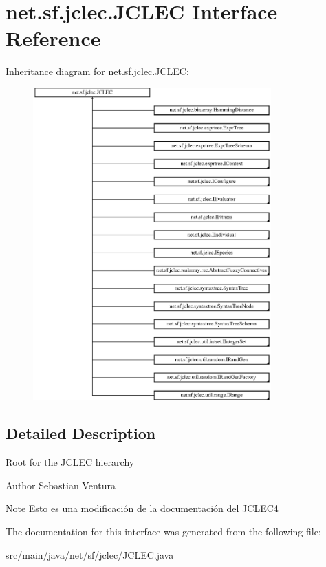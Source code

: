 \hypertarget{interfacenet_1_1sf_1_1jclec_1_1_j_c_l_e_c}{\section{net.\-sf.\-jclec.\-J\-C\-L\-E\-C Interface Reference}
\label{interfacenet_1_1sf_1_1jclec_1_1_j_c_l_e_c}
}
Inheritance diagram for net.\-sf.\-jclec.\-J\-C\-L\-E\-C\-:\begin{figure}[H]
\begin{center}
\leavevmode
\includegraphics[height=12.000000cm]{interfacenet_1_1sf_1_1jclec_1_1_j_c_l_e_c}
\end{center}
\end{figure}


\subsection{Detailed Description}
Root for the \hyperlink{interfacenet_1_1sf_1_1jclec_1_1_j_c_l_e_c}{J\-C\-L\-E\-C} hierarchy

\begin{DoxyAuthor}{Author}
Sebastian Ventura
\end{DoxyAuthor}
\begin{DoxyNote}{Note}
Esto es una modificaci\'{o}n de la documentaci\'{o}n del J\-C\-L\-E\-C4 
\end{DoxyNote}


The documentation for this interface was generated from the following file\-:\begin{DoxyCompactItemize}
\item 
src/main/java/net/sf/jclec/J\-C\-L\-E\-C.\-java\end{DoxyCompactItemize}
